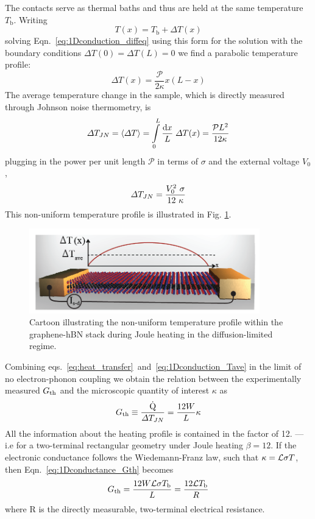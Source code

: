 The contacts serve as thermal baths and thus are held at the same temperature $T_\mathrm{b}$. Writing 
\begin{equation}
T(x) = T_\mathrm{b} + \Delta T(x)
\end{equation}
solving Eqn.~\ref{eq:1Dconduction_diffeq} using this form for the solution with the boundary conditions $\Delta T(0) = \Delta T(L) = 0$ we find a parabolic temperature profile:
\begin{equation}
\Delta T(x) = \frac{\mathcal{P}}{2\kappa}x(L-x) 
\end{equation}
The average temperature change in the sample, which is directly measured through Johnson noise thermometry, is 
\begin{equation}\label{eq:1Dconduction_Tave}
\Delta T_{JN} = \langle\Delta T\rangle = \int\limits_0^L \frac{\mathrm{d}x}{L}\; \Delta T(x)  = \frac{\mathcal{P}L^2}{12\kappa}
\end{equation}
plugging in the power per unit length $\mathcal{P}$ in terms of $\sigma$ and the external voltage $V_0$,
\begin{equation}
\Delta T_{JN} = \frac{V_0^2~\sigma}{12~\kappa}
\end{equation}
This non-uniform temperature profile is illustrated in Fig. \ref{fig:cartoon_Tprofile}.   
\begin{figure}
\centering
\includegraphics[width=100mm]{figures/thermal_via_noise/picture_temperature_profile.png}
\caption{Cartoon illustrating the non-uniform temperature profile within the graphene-hBN stack during Joule heating in the diffusion-limited regime.}
\label{fig:cartoon_Tprofile}
\end{figure}

Combining eqs.~\ref{eq:heat_transfer}~and~\ref{eq:1Dconduction_Tave} in the limit of no electron-phonon coupling we obtain the relation between the experimentally measured $G_{\mathrm{th}}$ and the microscopic quantity of interest $\kappa$ as
\begin{equation}\label{eq:1Dconductance_Gth}
G_{\mathrm{th}} \equiv \frac{\dot{\mathrm{Q}}}{\Delta T_{JN}} = \frac{12W}{L} \kappa
\end{equation}
All the information about the heating profile is contained in the factor of 12. --- i.e for a two-terminal rectangular geometry under Joule heating $\beta = 12$. If the electronic conductance follows the Wiedemann-Franz law, such that $\kappa=\mathcal{L}\sigma T$, then Eqn.~\ref{eq:1Dconductance_Gth} becomes
\begin{equation}\label{eq:1Dconductance_GthWF}
G_{\mathrm{th}} = \frac{12W\mathcal{L}\sigma T_\mathrm{b}}{L} = \frac{12\mathcal{L} T_\mathrm{b}}{R}
\end{equation}
where R is the directly measurable, two-terminal electrical resistance.

